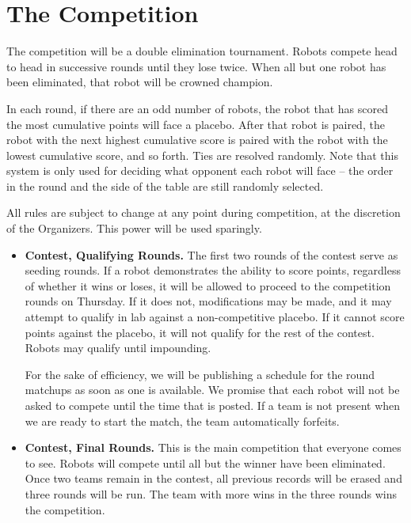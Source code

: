 \section{The Competition}
\label{compete}

The competition will be a double elimination tournament.  Robots compete
head to head in successive rounds until they lose twice.  When all but one
robot has been eliminated, that robot will be crowned champion.

In each round, if there are an odd number of robots, the robot that
has scored the most cumulative points will face a placebo.  After that
robot is paired, the robot with the next highest cumulative score is
paired with the robot with the lowest cumulative score, and so forth.
Ties are resolved randomly.  Note that this system is only used for
deciding what opponent each robot will face -- the order in the round
and the side of the table are still randomly selected.

All rules are subject to change at any point during competition, at
the discretion of the Organizers.  This power will be used sparingly.

\begin{itemize}

\item {\bf Contest, Qualifying Rounds.}
The first two rounds of the contest serve as seeding rounds.  If
a robot demonstrates the ability to score points, regardless of whether it wins
or loses, it will be allowed to proceed to the competition rounds on Thursday.
If it does not, modifications may be made, and it may attempt to qualify in lab
against a non-competitive placebo.  If it cannot score points against the
placebo, it will not qualify for the rest of the contest.  Robots may qualify
until impounding.

For the sake of efficiency, we will be publishing a schedule for the round
matchups as soon as one is available.  We promise that each robot will not be
asked to compete until the time that is posted.  If a team is not present when
we are ready to start the match, the team automatically forfeits.

\item {\bf Contest, Final Rounds.}  This is the main competition that
  everyone comes to see.  Robots will compete until all but the winner
  have been eliminated.  Once two teams remain in the contest, all
  previous records will be erased and three rounds will be run.  The
  team with more wins in the three rounds wins the competition.

\end{itemize}

